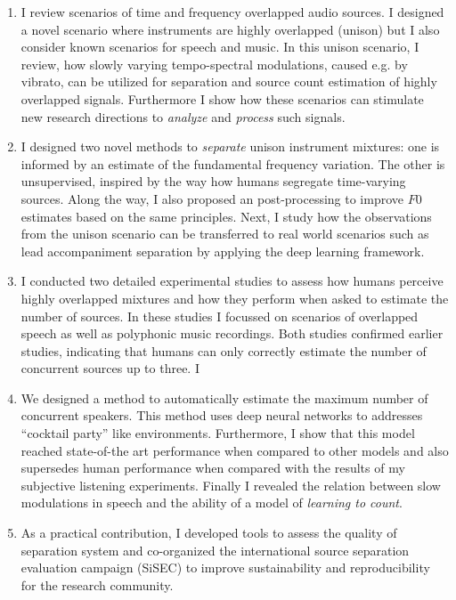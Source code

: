 \begin{enumerate}
\item I review scenarios of time and frequency overlapped audio sources.
I designed a novel scenario where instruments are highly overlapped (unison) but I also consider known scenarios for speech and music.
In this unison scenario, I review, how slowly varying tempo-spectral modulations, caused e.g. by vibrato, can be utilized for separation and source count estimation of highly overlapped signals.
Furthermore I show how these scenarios can stimulate new research directions to \emph{analyze} and \emph{process} such signals.\\

\item I designed two novel methods to \emph{separate} unison instrument mixtures: one is informed by an estimate of the fundamental frequency variation.
The other is unsupervised, inspired by the way how humans segregate time-varying sources.
Along the way, I also proposed an post-processing to improve \(F0\) estimates based on the same principles.
Next, I study how the observations from the unison scenario can be transferred to real world scenarios such as lead accompaniment separation by applying the deep learning framework.
\\

\item I conducted two detailed experimental studies to assess how humans perceive highly overlapped mixtures and how they perform when asked to estimate the number of sources.
In these studies I focussed on scenarios of overlapped speech as well as polyphonic music recordings. 
Both studies confirmed earlier studies, indicating that humans can only correctly estimate the number of concurrent sources up to three.
I \\

\item We designed a method to automatically estimate the maximum number of concurrent speakers. This method uses deep neural networks to addresses ``cocktail party'' like environments.
Furthermore, I show that this model reached state-of-the art performance when compared to other models and also supersedes human performance when compared with the results of my subjective listening experiments.
Finally I revealed the relation between slow modulations in speech and the ability of a model of \emph{learning to count}.\\

\item As a practical contribution, I developed tools to assess the quality of separation system and co-organized the international source separation evaluation campaign (SiSEC) to improve sustainability and reproducibility for the research community. 
\end{enumerate}

